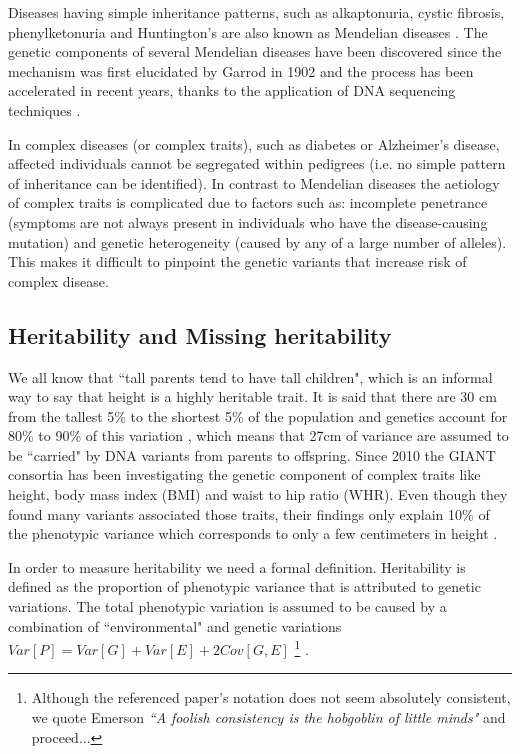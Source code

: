 Diseases having simple inheritance patterns, such as alkaptonuria, cystic fibrosis, phenylketonuria and Huntington's are also known as Mendelian diseases \cite{kennedy2001}. The genetic components of several Mendelian diseases have been discovered since the mechanism was first elucidated by Garrod in 1902 and the process has been accelerated in recent years, thanks to the application of DNA sequencing techniques \cite{bamshad2011exome}.

In complex diseases (or complex traits), such as diabetes or Alzheimer's disease, affected individuals cannot be segregated within pedigrees (i.e. no simple pattern of inheritance can be identified). In contrast to Mendelian diseases the aetiology of complex traits is complicated due to factors such as: incomplete penetrance (symptoms are not always present in individuals who have the disease-causing mutation) and genetic heterogeneity (caused by any of a large number of alleles). This makes  it difficult to pinpoint the genetic variants that increase risk of complex disease.

\subsection{Heritability and Missing heritability}

We all know that ``tall parents tend to have tall children", which is an informal way to say that height is a highly heritable trait. It is said that there are 30 cm from the tallest 5\% to the shortest 5\% of the population and genetics account for 80\% to 90\% of this variation \cite{wood2014defining}, which means that 27cm of variance are assumed to be ``carried" by DNA variants from parents to offspring. Since 2010 the GIANT consortia has been investigating the genetic component of complex traits like height, body mass index (BMI) and waist to hip ratio (WHR). Even though they found many variants associated those traits, their findings only explain 10\% of the phenotypic variance which corresponds to only a few centimeters in height \cite{wood2014defining}.

In order to measure heritability we need a formal definition. Heritability is defined as the proportion of phenotypic variance that is attributed to genetic variations. The total phenotypic variation is assumed to be caused by a combination of ``environmental" and genetic variations $Var[P] = Var[G] + Var[E] + 2 Cov[G, E]$ 
\iffinal
\footnote{Although the referenced paper's notation does not seem absolutely consistent, we quote Emerson \textit{``A foolish consistency is the hobgoblin of little minds"} and proceed...}
\fi
.

